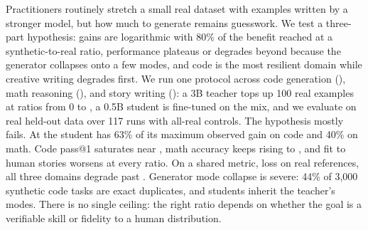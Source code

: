 Practitioners routinely stretch a small real dataset with examples written by a stronger model, but how much to generate remains guesswork.
We test a three-part hypothesis: gains are logarithmic with 80\% of the benefit reached at a  synthetic-to-real ratio, performance plateaus or degrades beyond  because the generator collapses onto a few modes, and code is the most resilient domain while creative writing degrades first.
We run one protocol across code generation (\mbpp), math reasoning (\gsm), and story writing (\roc): a 3B teacher tops up 100 real examples at ratios from 0 to , a 0.5B student is fine-tuned on the mix, and we evaluate on real held-out data over 117 runs with all-real controls.
The hypothesis mostly fails.
At  the student has 63\% of its maximum observed gain on code and 40\% on math.
Code pass@1 saturates near , math accuracy keeps rising to , and fit to human stories worsens at every ratio.
On a shared metric, loss on real references, all three domains degrade past .
Generator mode collapse is severe: 44\% of 3,000 synthetic code tasks are exact duplicates, and students inherit the teacher's modes.
There is no single ceiling: the right ratio depends on whether the goal is a verifiable skill or fidelity to a human distribution.

